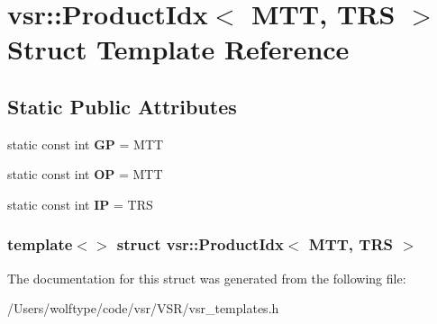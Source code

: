 \hypertarget{structvsr_1_1_product_idx_3_01_m_t_t_00_01_t_r_s_01_4}{\section{vsr\-:\-:Product\-Idx$<$ M\-T\-T, T\-R\-S $>$ Struct Template Reference}
\label{structvsr_1_1_product_idx_3_01_m_t_t_00_01_t_r_s_01_4}
}
\subsection*{Static Public Attributes}
\begin{DoxyCompactItemize}
\item 
\hypertarget{structvsr_1_1_product_idx_3_01_m_t_t_00_01_t_r_s_01_4_a784c40a0b5cb4d3bc8f683d638dab9a5}{static const int {\bfseries G\-P} = M\-T\-T}\label{structvsr_1_1_product_idx_3_01_m_t_t_00_01_t_r_s_01_4_a784c40a0b5cb4d3bc8f683d638dab9a5}

\item 
\hypertarget{structvsr_1_1_product_idx_3_01_m_t_t_00_01_t_r_s_01_4_a5f151afb73aef2855788ad4fd0e8f2b6}{static const int {\bfseries O\-P} = M\-T\-T}\label{structvsr_1_1_product_idx_3_01_m_t_t_00_01_t_r_s_01_4_a5f151afb73aef2855788ad4fd0e8f2b6}

\item 
\hypertarget{structvsr_1_1_product_idx_3_01_m_t_t_00_01_t_r_s_01_4_a604cff7504fe59ce5abe6002db56963c}{static const int {\bfseries I\-P} = T\-R\-S}\label{structvsr_1_1_product_idx_3_01_m_t_t_00_01_t_r_s_01_4_a604cff7504fe59ce5abe6002db56963c}

\end{DoxyCompactItemize}
\subsubsection*{template$<$$>$ struct vsr\-::\-Product\-Idx$<$ M\-T\-T, T\-R\-S $>$}



The documentation for this struct was generated from the following file\-:\begin{DoxyCompactItemize}
\item 
/\-Users/wolftype/code/vsr/\-V\-S\-R/vsr\-\_\-templates.\-h\end{DoxyCompactItemize}
